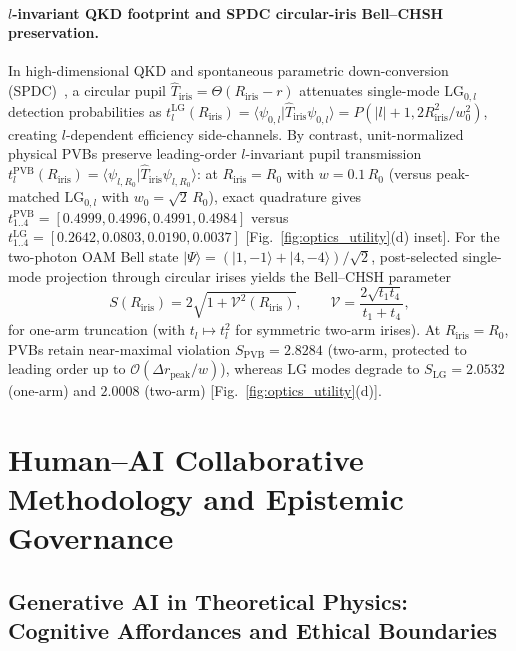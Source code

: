 \documentclass[aps,pra,reprint,amsmath,amssymb,floatfix,longbibliography]{revtex4-2}
\providecommand{\ket}[1]{\lvert#1\rangle}
\providecommand{\braket}[2]{\langle#1\vert#2\rangle}
\providecommand{\abs}[1]{\lvert#1\rvert}
\begin{document}
\paragraph*{$l$-invariant QKD footprint and SPDC circular-iris Bell--CHSH preservation.}
In high-dimensional QKD and spontaneous parametric down-conversion (SPDC)~\cite{Cerf2002,LawEberly2004,Walborn2010,Mirhosseini2015}, a circular pupil $\hat{T}_{\mathrm{iris}} = \Theta(R_{\mathrm{iris}} - r)$ attenuates single-mode $\mathrm{LG}_{0,l}$ detection probabilities as $t_l^{\mathrm{LG}}(R_{\mathrm{iris}}) = \braket{\psi_{0,l}}{\hat{T}_{\mathrm{iris}}\psi_{0,l}} = P(\abs{l}+1, 2R_{\mathrm{iris}}^2/w_0^2)$, creating $l$-dependent efficiency side-channels. By contrast, unit-normalized physical PVBs preserve leading-order $l$-invariant pupil transmission $t_l^{\mathrm{PVB}}(R_{\mathrm{iris}}) = \braket{\psi_{l,R_0}}{\hat{T}_{\mathrm{iris}}\psi_{l,R_0}}$: at $R_{\mathrm{iris}} = R_0$ with $w = 0.1\,R_0$ (versus peak-matched $\mathrm{LG}_{0,l}$ with $w_0 = \sqrt{2}\,R_0$), exact quadrature gives $t_{1..4}^{\mathrm{PVB}} = [0.4999, 0.4996, 0.4991, 0.4984]$ versus $t_{1..4}^{\mathrm{LG}} = [0.2642, 0.0803, 0.0190, 0.0037]$ [Fig.~\ref{fig:optics_utility}(d) inset]. For the two-photon OAM Bell state $\ket{\Psi} = (\ket{1,-1} + \ket{4,-4})/\sqrt{2}$, post-selected single-mode projection through circular irises yields the Bell--CHSH parameter~\cite{Clauser1969}
\begin{equation}
S(R_{\mathrm{iris}}) = 2\sqrt{1 + \mathcal{V}^2(R_{\mathrm{iris}})}, \qquad \mathcal{V} = \frac{2\sqrt{t_1 t_4}}{t_1 + t_4},
\label{eq:iris_chsh}
\end{equation}
for one-arm truncation (with $t_l \mapsto t_l^2$ for symmetric two-arm irises). At $R_{\mathrm{iris}} = R_0$, PVBs retain near-maximal violation $S_{\mathrm{PVB}} = 2.8284$ (two-arm, protected to leading order up to $\mathcal{O}(\Delta r_{\mathrm{peak}}/w)$), whereas $\mathrm{LG}$ modes degrade to $S_{\mathrm{LG}} = 2.0532$ (one-arm) and $2.0008$ (two-arm) [Fig.~\ref{fig:optics_utility}(d)].

\section{Human--AI Collaborative Methodology and Epistemic Governance}
\label{sec:ai_methodology}

\subsection{Generative AI in Theoretical Physics: Cognitive Affordances and Ethical Boundaries}
\label{subsec:ai_ethics}
\end{document}
